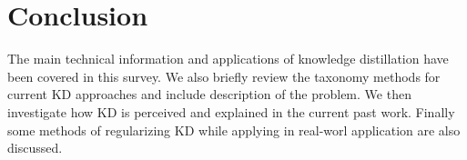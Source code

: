 \section{Conclusion}
The main technical information and applications of knowledge distillation have been covered in this survey.
We also briefly review the taxonomy methods for current KD approaches and include description of the problem. We then investigate how KD is perceived and explained in the current past work. Finally some methods of regularizing KD while applying in real-worl application are also discussed.